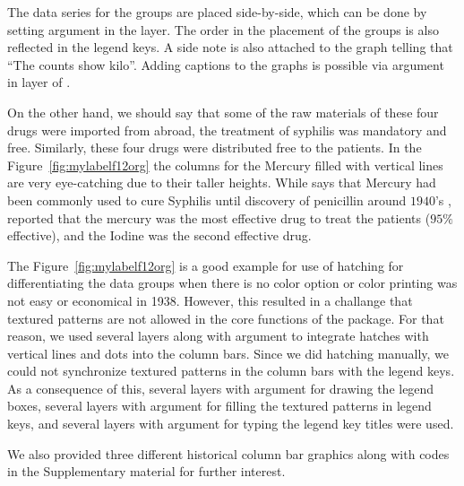 The data series for the groups are placed side-by-side, which can be done by setting argument  in the  layer. The order in the placement of the groups is also reflected in the legend keys. A side note is also attached to the graph telling that \enquote{The counts show kilo}. Adding captions to the graphs is possible via  argument in  layer of . 

On the other hand, we should say that some of  the raw materials of these four drugs were imported from abroad, the treatment of  syphilis was mandatory and free. Similarly, these four drugs were distributed free to the patients. In the Figure~\ref{fig:mylabelf12org} the columns for the Mercury filled with vertical lines are very eye-catching due to their taller heights. While \citet{Si} says that Mercury had been commonly used to cure Syphilis  until discovery of penicillin around $1940$'s ,   \citet{mumyakmaz7illet} reported that the mercury was the most effective drug to treat the patients ($95\% $ effective), and the Iodine was the second effective drug.

The Figure~\ref{fig:mylabelf12org} is a good example for use of hatching for differentiating the data groups when there is no color option or color printing was not easy or economical in 1938.  However, this resulted in a challange that textured patterns are not allowed in the core functions of the  package. For that reason, we used several  layers along with  argument to integrate hatches with vertical lines and dots into the column bars. Since we did hatching manually, we could not synchronize textured patterns in the column bars with the legend keys. As a consequence of this, several  layers with  argument for drawing the legend boxes, several  layers with  argument for filling the textured patterns in legend keys, and several  layers with  argument for typing the legend key titles were used. 

We also provided three different historical column bar graphics along with  codes in the Supplementary material for further interest.

